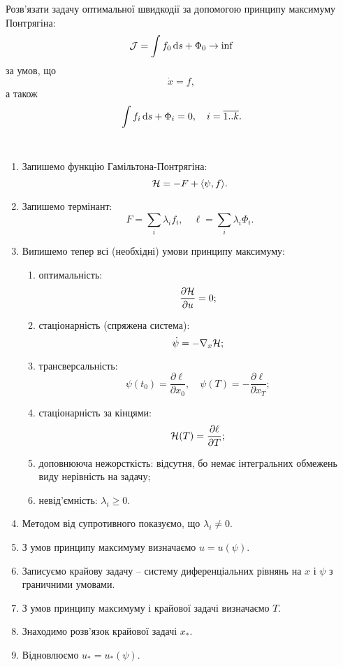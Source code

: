 \begin{problem*}
	Розв'язати задачу оптимальної швидкодії за допомогою принципу максимуму Понтрягіна: \[ \mathcal{J}  = \int f_0 \mathop{}\!\mathrm{d} s + \Phi_0 \to \inf \] за умов, що \[ \dot x = f, \] а також \[ \int f_i \mathop{}\!\mathrm{d} s + \Phi_i = 0 , \quad i = \overline{1..k}. \]
\end{problem*}


\begin{algorithm} \tt
	\begin{enumerate}
		\item Запишемо функцію Гамільтона-Понтрягіна: \[ \mathcal{H} = -F + \langle \psi, f \rangle. \]
		\item Запишемо термінант: \[ F = \sum_i \lambda_i f_i, \quad \ell = \sum_i \lambda_i \Phi_i. \]
		\item Випишемо тепер всі (необхідні) умови принципу максимуму:
		\begin{enumerate}
			\item оптимальність: \[\frac{\partial \mathcal{H}}{\partial u} = 0;\]
			\item стаціонарність (спряжена система): \[\dot \psi = - \nabla_x \mathcal{H};\]
			\item трансверсальність: \[\psi(t_0) = \frac{\partial \ell}{\partial x_0}, \quad \psi(T) = - \frac{\partial \ell}{\partial x_T};\]
			\item стаціонарність за кінцями: \[ \mathcal{H}(T) = \frac{\partial \ell}{\partial T}; \]
			\item доповнююча нежорсткість: відсутня, бо немає інтегральних \allowbreak об\-ме\-жень виду нерівність на задачу;
			\item невід'ємність: $\lambda_i \ge 0$.
		\end{enumerate}
		\item Методом від супротивного показуємо, що $\lambda_i \ne 0$.
		\item З умов принципу максимуму визначаємо $u = u(\psi)$.
		\item Записуємо крайову задачу -- систему диференціальних рівнянь на $x$ і $\psi$ з граничними умовами.
		\item З умов принципу максимуму і крайової задачі визначаємо $T$.
		\item Знаходимо розв'язок крайової задачі $x_*$.
		\item Відновлюємо $u_* = u_*(\psi)$.
	\end{enumerate}
\end{algorithm}



\newpage

